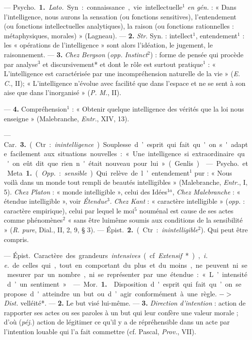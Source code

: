 \begin{itemize}[leftmargin=1cm, label=, itemsep=1pt]
 —  \si{Psycho.} {\bf 1.} {\it Lato.} Syn. :
connaissance, vie intellectuelle$^1$ {\it en gén.} : « Dans l'intelligence,
nous aurons la sensation (ou fonctions sensitives), l’entendement (ou
fonctions intellectuelles analytiques), la raison (ou fonctions
rationnelles : métaphysiques, morales) » (Lagneau). — {\bf 2.} {\it Str.}
Syn. : intellect$^1$, entendement$^1$ : les « opérations de l'intelligence »
sont alors l’idéation, le jugement, le raisonnement. —  {\bf 3.} {\it Chez
Bergson} ({\it opp.} {\it Instinct}$^2$) : forme de pensée qui procède par
analyse$^3$ et discursivement* et dont le rôle est surtout pratique$^1$ :
« L’intelligence est caractérisée par une incompréhension naturelle de la
vie » ({\it E. C.}, II); « L'intelligence n’évolue avec facilité que dans
l’espace et ne se sent à son aise que dans l'inorganisé » ({\it P. M.}, II).

—  {\bf 4.} Compréhension$^1$ : « Obtenir quelque intelligence
des vérités que la loi nous enseigne » (Malebranche, {\it Entr.},
{\footnotesize XIV}, 13).

— \si{Car.} {\bf 3.} (Ctr. : {\it inintelligence}). Souplesse d’esprit qui
fait qu'on s'adapte facilement aux situations nouvelles : « ... Une
intelligence si extraordinaire qu'on eût dit que rien n'était nouveau pour
lui » (Genlis).

 — \si{Psycho.} et Meta. {\bf 1.} ({\it Opp.} :
{\it sensible}). Qui relève de l’entendement$^1$ pur : « Nous voilà dans un
monde tout rempli de beautés intelligibles » (Malebranche, {\it Entr.}, I,
5). {\it Chez Platon} : « monde intelligible », celui des Idées$^{1a}$,
{\it Chez Malebranche} : « étendue intelligible », voir {\it Étendue}$^3$.
{\it Chez Kant} : « caractère intelligible » ({\it opp.} : caractère
empirique), celui par lequel le moi$^5$ nouménal est cause de ses actes comme
phénomènes$^2$ « sans être luimême soumis aux conditions de la
sensibilité » ({\it R. pure}, Dial., II, 2, 9, § 3). — \si{Épist.} {\bf 2.}
(Ctr. : {\it inintelligible}$^2$). Qui peut être compris.

 — \si{Épist.} Caractère des grandeurs {\it intensives} (cf.
{\it Extensif}*), {\it i. e.} de celles qui, tout en comportant du plus et du
moins, ne peuvent ni se mesurer par un nombre, ni se représenter par une
étendue : « L’intensité d’un sentiment ».

 — \si{Mor.} {\bf 1.}  Disposition d'esprit qui
fait qu’on se propose d'atteindre un but ou d’agir conformément à une règle.
$->$ {\it Dist.} velléité*. — {\bf 2.}  Le but visé lui-même.
— {\bf 3.} {\it Direction d'intention} : action de rapporter ses actes ou ses
paroles à un but qui leur confère une valeur morale ; d’où ({\it péj.})
action de légitimer ce qu'il y a de répréhensible dans un acte par
l'intention louable qui l'a fait commettre (cf. Pascal, {\it Prov.}, VII).


\end{itemize}
